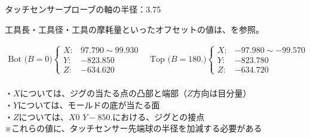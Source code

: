 \begin{hosoku}
タッチセンサープローブの軸の半径：3.75
\end{hosoku}
\begin{hosoku}
工具長・工具径・工具の摩耗量といったオフセットの値は、を参照。
\end{hosoku}

\vfill
\begin{tcolorbox}[title={2023/07/28時点の\MMname 実測値}, fonttitle=\gtfamily\bfseries]
\begin{align*}
  \text{Bot ($B=0$)}
  \left\{
  \begin{array}{rl}
    X: & 97.790 \sim 99.930\\
    Y: & -823.850\\
    Z: & -634.620
  \end{array}
  \right.\quad
  \text{Top ($B=180.$)}
  \left\{
  \begin{array}{rl}
    X: & -97.980 \sim -99.570\\
    Y: & -823.780\\
    Z: & -634.720
  \end{array}
  \right.
\end{align*}\\
・$X$については、ジグの当たる点の凸部と端部（$Z$方向は目分量）\\
・$Y$については、モールドの底が当たる面\\
・$Z$については、$X0$ $Y-850.$における、ジグとの接点\\
※これらの値に、タッチセンサー先端球の半径を加減する必要がある
\end{tcolorbox}
